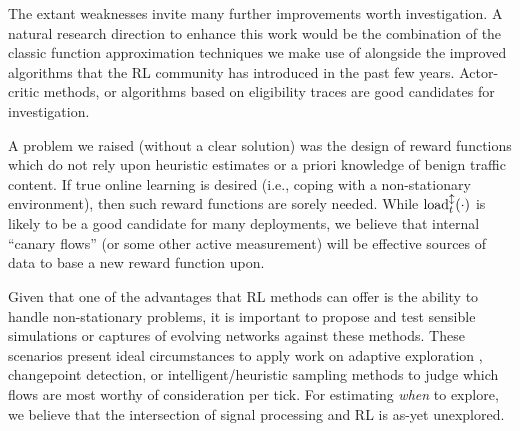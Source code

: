 \documentclass[conference, letterpaper, 10pt, times]{IEEEtran}
\begin{document}
The extant weaknesses invite many further improvements worth investigation.
A natural research direction to enhance this work would be the combination of the classic function approximation techniques we make use of alongside the improved algorithms that the RL community has introduced in the past few years.
Actor-critic methods, or algorithms based on eligibility traces are good candidates for investigation. 

A problem we raised (without a clear solution) was the design of reward functions which do not rely upon heuristic estimates or a priori knowledge of benign traffic content.
If true online learning is desired (i.e., coping with a non-stationary environment), then such reward functions are sorely needed.
While $\operatorname{load}^{\updownarrow}_{t}(\cdot)$ is likely to be a good candidate for many deployments, we believe that internal ``canary flows'' (or some other active measurement) will be effective sources of data to base a new reward function upon.

Given that one of the advantages that RL methods can offer is the ability to handle non-stationary problems, it is important to propose and test sensible simulations or captures of evolving networks against these methods.
These scenarios present ideal circumstances to apply work on adaptive exploration \cite{DBLP:conf/ki/Tokic10, DBLP:conf/ki/TokicP11, DBLP:conf/annpr/TokicP12}, changepoint detection, or intelligent/heuristic sampling methods to judge which flows are most worthy of consideration per tick.
For estimating \emph{when} to explore, we believe that the intersection of signal processing and RL is as-yet unexplored.
\end{document}
